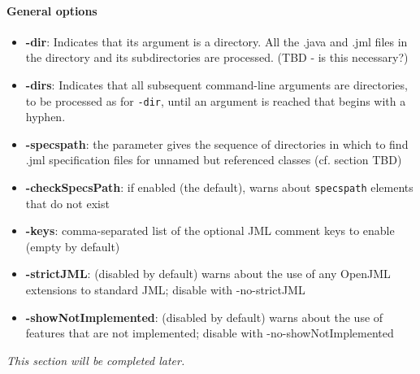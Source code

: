 \paragraph{General options}
\begin{itemize}[noitemsep,nolistsep]
\item \textbf{-dir}: Indicates that its argument is a directory. All the .java and .jml files in the directory and its subdirectories are processed. (TBD - is this necessary?)
\item \textbf{-dirs}: Indicates that all subsequent command-line arguments are directories, to be processed as for \texttt{-dir}, until an argument is reached that begins with a hyphen. 
\item \textbf{-specspath}: the parameter gives the sequence of directories in which to find .jml specification files for unnamed but referenced classes (cf. section TBD)
\item \textbf{-checkSpecsPath}: if enabled (the default), warns about \texttt{specspath} elements that do not exist
\item \textbf{-keys}: comma-separated list of the optional JML comment keys to enable (empty by default)
\item \textbf{-strictJML}: (disabled by default) warns about the use of any OpenJML extensions to standard JML; disable with -no-strictJML
\item \textbf{-showNotImplemented}: (disabled by default) warns about the use of features that are not implemented; disable with -no-showNotImplemented
\end{itemize}


\textit{This section will be completed later.} %



